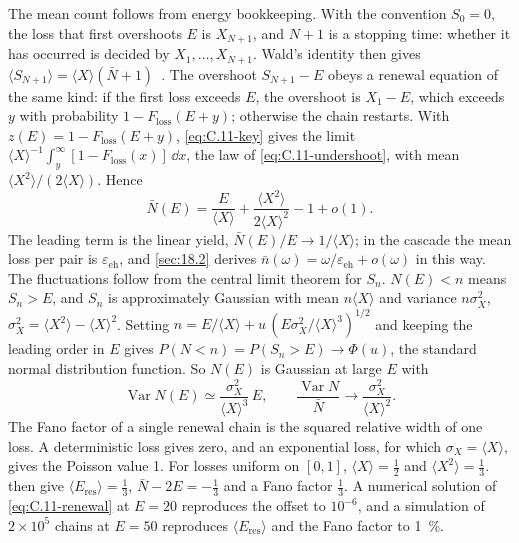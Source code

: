 The mean count follows from energy bookkeeping. With the convention $S_0 = 0$, the loss that first overshoots $E$ is $X_{N+1}$, and $N + 1$ is a stopping time: whether it has occurred is decided by $X_1, \dots, X_{N+1}$. Wald's identity then gives $\langle S_{N+1}\rangle = \langle X\rangle(\bar N + 1)$~\cite{feller1971introduction}. The overshoot $S_{N+1} - E$ obeys a renewal equation of the same kind: if the first loss exceeds $E$, the overshoot is $X_1 - E$, which exceeds $y$ with probability $1 - F_{\mathrm{loss}}(E + y)$; otherwise the chain restarts. With $z(E) = 1 - F_{\mathrm{loss}}(E + y)$, \cref{eq:C.11-key} gives the limit $\langle X\rangle^{-1}\int_y^\infty[1 - F_{\mathrm{loss}}(x)]\,\dd x$, the law of \cref{eq:C.11-undershoot}, with mean $\langle X^2\rangle/(2\langle X\rangle)$. Hence
\begin{equation}
  \bar N(E) = \frac{E}{\langle X\rangle} + \frac{\langle X^2\rangle}{2\langle X\rangle^2} - 1 + o(1) .
  \label{eq:C.11-linear}
\end{equation}
The leading term is the linear yield, $\bar N(E)/E \to 1/\langle X\rangle$; in the cascade the mean loss per pair is $\varepsilon_{\mathrm{eh}}$, and \cref{sec:18.2} derives $\bar n(\omega) = \omega/\varepsilon_{\mathrm{eh}} + o(\omega)$ in this way. The fluctuations follow from the central limit theorem for $S_n$. $N(E) < n$ means $S_n > E$, and $S_n$ is approximately Gaussian with mean $n\langle X\rangle$ and variance $n\sigma_X^2$, $\sigma_X^2 = \langle X^2\rangle - \langle X\rangle^2$. Setting $n = E/\langle X\rangle + u\,(E\sigma_X^2/\langle X\rangle^3)^{1/2}$ and keeping the leading order in $E$ gives $P(N < n) = P(S_n > E) \to \Phi(u)$, the standard normal distribution function. So $N(E)$ is Gaussian at large $E$ with
\begin{equation}
  \operatorname{Var}N(E) \simeq \frac{\sigma_X^2}{\langle X\rangle^3}\,E, \qquad
  \frac{\operatorname{Var}N}{\bar N} \to \frac{\sigma_X^2}{\langle X\rangle^2} .
  \label{eq:C.11-fano}
\end{equation}
The Fano factor of a single renewal chain is the squared relative width of one loss. A deterministic loss gives zero, and an exponential loss, for which $\sigma_X = \langle X\rangle$, gives the Poisson value 1. For losses uniform on $[0, 1]$, $\langle X\rangle = \tfrac12$ and $\langle X^2\rangle = \tfrac13$.  then give $\langle E_{\mathrm{res}}\rangle = \tfrac13$, $\bar N - 2E = -\tfrac13$ and a Fano factor $\tfrac13$. A numerical solution of \cref{eq:C.11-renewal} at $E = 20$ reproduces the offset to $10^{-6}$, and a simulation of $2\times10^{5}$ chains at $E = 50$ reproduces $\langle E_{\mathrm{res}}\rangle$ and the Fano factor to \SI{1}{\percent}.

